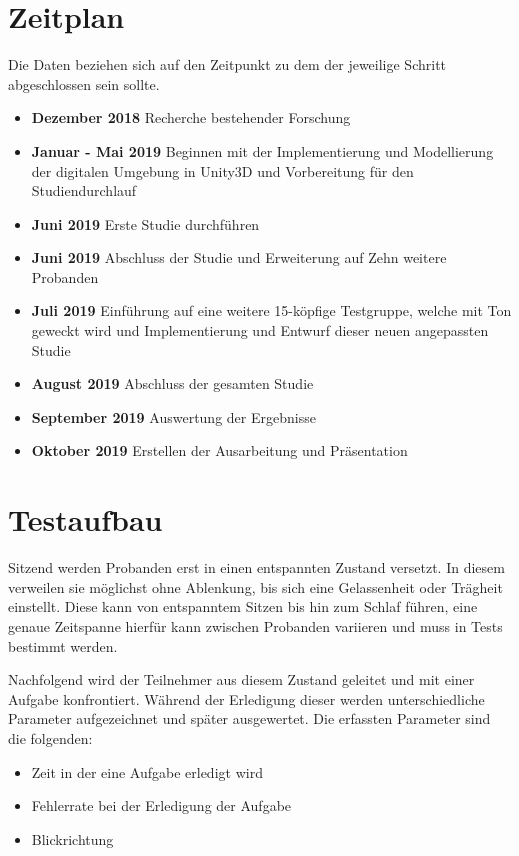 \section{Zeitplan}
Die Daten beziehen sich auf den Zeitpunkt zu dem der jeweilige Schritt abgeschlossen sein sollte.
\begin{itemize}
	\item \textbf{Dezember 2018} Recherche bestehender Forschung
	\item \textbf{Januar - Mai 2019} Beginnen mit der Implementierung und Modellierung der digitalen Umgebung in Unity3D und Vorbereitung für den Studiendurchlauf
	\item \textbf{Juni 2019} Erste Studie durchführen
	\item \textbf{Juni 2019} Abschluss der Studie und Erweiterung auf Zehn weitere Probanden
	\item \textbf{Juli 2019} Einführung auf eine weitere 15-köpfige Testgruppe, welche mit Ton geweckt wird und Implementierung und Entwurf dieser neuen angepassten Studie
	\item \textbf{August 2019} Abschluss der gesamten Studie
	\item \textbf{September 2019} Auswertung der Ergebnisse
	\item \textbf{Oktober 2019} Erstellen der Ausarbeitung und Präsentation
\end{itemize}

\section{Testaufbau}
Sitzend werden Probanden erst in einen entspannten Zustand versetzt. In diesem verweilen sie möglichst ohne Ablenkung, bis sich eine Gelassenheit oder Trägheit einstellt. Diese kann von entspanntem Sitzen bis hin zum Schlaf führen, eine genaue Zeitspanne hierfür kann zwischen Probanden variieren und muss in Tests bestimmt werden.

Nachfolgend wird der Teilnehmer aus diesem Zustand geleitet und mit einer Aufgabe konfrontiert. Während der Erledigung dieser werden unterschiedliche Parameter aufgezeichnet und später ausgewertet. Die erfassten Parameter sind die folgenden:

\begin{itemize}
	\item Zeit in der eine Aufgabe erledigt wird
	\item Fehlerrate bei der Erledigung der Aufgabe
	\item Blickrichtung
\end{itemize}

